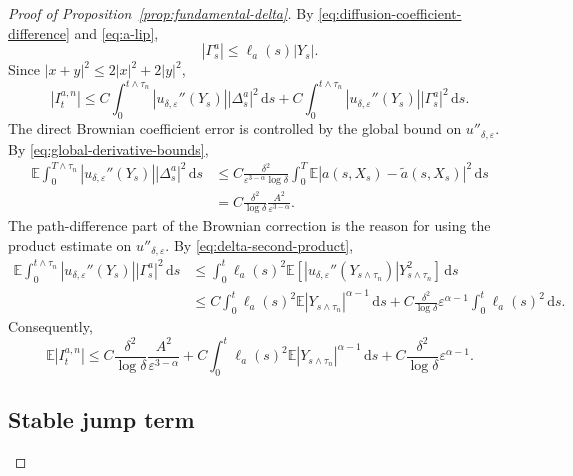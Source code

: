 \documentclass[10pt,a4paper]{amsart}
\newcommand{\E}{\mathbb{E}}
\newcommand{\1}{\mathbf{1}}
\newcommand{\dd}{\,\mathrm{d}}
\newcommand{\wt}{\tilde}
\newcommand{\eps}{\varepsilon}
\begin{document}
\begin{proof}[Proof of Proposition~\ref{prop:fundamental-delta}]
By \eqref{eq:diffusion-coefficient-difference} and \eqref{eq:a-lip},
\[
  |\Gamma_s^a|\le \ell_a(s)|Y_s|.
\]
Since $|x+y|^2\le2|x|^2+2|y|^2$,
\[
|I_t^{a,n}|\le C\int_0^{t\wedge\tau_n} |u_{\delta,\eps}''(Y_s)||\Delta_s^a|^2\dd s
+C\int_0^{t\wedge\tau_n} |u_{\delta,\eps}''(Y_s)||\Gamma_s^a|^2\dd s.
\]
The direct Brownian coefficient error is controlled by the global bound on $u''_{\delta,\eps}$. By \eqref{eq:global-derivative-bounds},
\begin{align*}
\E\int_0^{T\wedge\tau_n} |u_{\delta,\eps}''(Y_s)||\Delta_s^a|^2\dd s
&\le C\frac{\delta^2}{\eps^{3-\alpha}\log\delta}
\int_0^T\E |a(s,X_s)-\wt a(s,X_s)|^2\dd s\\
&=C\frac{\delta^2}{\log\delta}\frac{A^2}{\eps^{3-\alpha}}.
\end{align*}
The path-difference part of the Brownian correction is the reason for using the product estimate on $u''_{\delta,\eps}$. By \eqref{eq:delta-second-product},
\begin{align*}
\E\int_0^{t\wedge\tau_n} |u_{\delta,\eps}''(Y_s)||\Gamma_s^a|^2\dd s
&\le \int_0^t \ell_a(s)^2\E\left[|u_{\delta,\eps}''(Y_{s\wedge\tau_n})|Y_{s\wedge\tau_n}^2\right]\dd s\\
&\le C\int_0^t \ell_a(s)^2\E |Y_{s\wedge\tau_n}|^{\alpha-1}\dd s
+C\frac{\delta^2}{\log\delta}\eps^{\alpha-1}\int_0^t \ell_a(s)^2\dd s.
\end{align*}
Consequently,
\begin{equation}\label{eq:brownian-estimate}
\E |I_t^{a,n}|
\le C\frac{\delta^2}{\log\delta}\frac{A^2}{\eps^{3-\alpha}}
+C\int_0^t \ell_a(s)^2\E|Y_{s\wedge\tau_n}|^{\alpha-1}\dd s
+C\frac{\delta^2}{\log\delta}\eps^{\alpha-1}.
\end{equation}

\subsection{Stable jump term}
\label{subsec:stable-term}


\end{proof}
\end{document}
